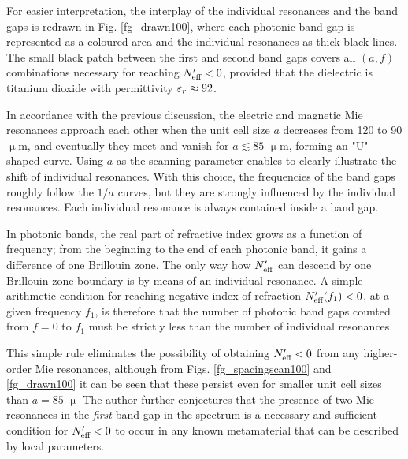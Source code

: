 For easier interpretation, the interplay of the individual resonances and the band gaps is redrawn in Fig. \ref{fg_drawn100}, where each photonic band gap is represented as a coloured area and the individual resonances as thick black lines. The small black patch between the first and second band gaps covers all $(a,f)$ combinations   necessary for reaching $N_{\text{eff} }'<0$, provided that the dielectric is titanium dioxide with permittivity $\varepsilon_r \approx 92$. 

In accordance with the previous discussion, the electric and magnetic Mie resonances approach each other when the unit cell size $a$ decreases from 120 to 90 $\upmu$m, and eventually they meet and vanish for $a \lesssim 85$ $\upmu$m, forming an "U"-shaped curve. Using $a$ as the scanning parameter enables to clearly illustrate the shift of individual resonances. With this choice, the frequencies of the band gaps roughly follow the $1/a$ curves, but they are strongly influenced by the individual resonances. Each individual resonance is always contained inside a band gap.

In photonic bands, the real part of refractive index grows as a function of frequency; from the beginning to the end of each photonic band, it gains a difference of one Brillouin zone. The only way how $N_{\text{eff} }'$ can descend by one Brillouin-zone boundary is by means of an individual resonance. A simple arithmetic condition for reaching negative index of refraction $N_{\text{eff} }'(f_1)<0$, at a given frequency $f_1$, is therefore that the number of photonic band gaps counted from $f=0$ to $f_1$ must be strictly less than the number of individual resonances. 

This simple rule eliminates the possibility of obtaining $N_{\text{eff} }'<0$ from any higher-order Mie resonances, although from Figs. \ref{fg_spacingscan100} and \ref{fg_drawn100} it can be seen that these persist even for smaller unit cell sizes than $a=85$ $\upmu$ 
The author further conjectures that the presence of two Mie resonances in the \textit{first} band gap in the spectrum is a necessary and sufficient condition for $N_{\text{eff} }'<0$ to occur in any known metamaterial that can be described by local parameters.

